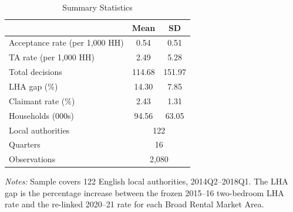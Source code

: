 \begin{table}[t]
\centering
\caption{Summary Statistics}
\label{tab:sumstats}
\begin{tabular}{lcc}
\hline\hline
 & Mean & SD \\
\hline
Acceptance rate (per 1,000 HH) & 0.54 & 0.51 \\
TA rate (per 1,000 HH) & 2.49 & 5.28 \\
Total decisions & 114.68 & 151.97 \\
LHA gap (\%) & 14.30 & 7.85 \\
Claimant rate (\%) & 2.43 & 1.31 \\
Households (000s) & 94.56 & 63.05 \\
\hline
Local authorities & \multicolumn{2}{c}{122} \\
Quarters & \multicolumn{2}{c}{16} \\
Observations & \multicolumn{2}{c}{2,080} \\
\hline\hline
\end{tabular}
\begin{tablenotes}
\small
\item \textit{Notes:} Sample covers 122 English local authorities, 2014Q2--2018Q1. The LHA gap is the percentage increase between the frozen 2015--16 two-bedroom LHA rate and the re-linked 2020--21 rate for each Broad Rental Market Area.
\end{tablenotes}
\end{table}
